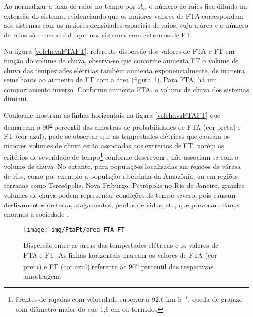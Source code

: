 Ao normalizar a taxa de raios no tempo por $A_t$, o número de raios fica diluído na extensão do sistema, evidenciando que os maiores valores de FTA correspondem aos sistemas com as maiores densidades espaciais de raios, cuja a área e o número de raios são menores do que nos sistemas com extremos de FT.

Na figura \ref{volchuvaFTAFT}, referente dispersão dos valores de FTA e FT em função do volume de chuva, observa-se que conforme aumenta FT o volume de chuva das tempestades elétricas também aumenta exponencialmente, de maneira semelhante ao aumento de FT com a área (figura \ref{areaFTAFTA}). Para FTA, há um comportamento inverso. Conforme aumenta FTA, o volume de chuva dos sistemas diminui. 

Conforme mostram as linhas horizontais na figura \ref{volchuvaFTAFT} que demarcam o 90\textsuperscript{\underline{o}} percentil das amostras de probabilidades de FTA (cor preta) e FT (cor azul), pode-se observar que as tempestades elétricas que causam os maiores volumes de chuva estão associadas aos extremos de FT, porém os critérios de severidade de tempo\footnote{Frentes de rajadas com velocidade superior a 92,6 km h$^{-1}$, queda de granizo com diâmetro maior do que 1,9 cm ou tornados} conforme descrevem \cite{carey1998, williams1999, zipser2006}, não associam-se com o volume de chuva.  No entanto, para populações localizadas em regiões de várzea de rios, como por exemplo a população ribeirinha da Amazônia, ou em regiões serranas como Teresópolis, Nova Friburgo, Petrópolis no Rio de Janeiro, grandes volumes de chuva podem representar condições de tempo severo, pois causam deslizamentos de terra, alagamentos, perdas de vidas, etc, que provocam danos enormes à sociedade \cite{INPEchuvaSevera, WikichuvaSevera, BBC}.


\begin{figure}[!ht]
  \centering
  \texttt{[image: img/FtaFt/area\_FTA\_FT]}   
  \caption{Dispersão entre as áreas das tempestades elétricas e os valores de FTA e FT. As linhas horizontais marcam os valores de FTA (cor preta) e FT (cor azul) referente ao 90\textsuperscript{\underline{o}} percentil das respectivas amostragem.}
  \label{areaFTAFTA}  
\end{figure}

